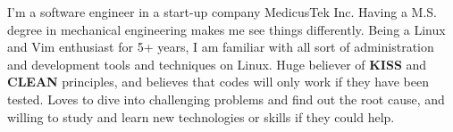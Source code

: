 

\begin{cvparagraph}

I'm a software engineer in a start-up company MedicusTek Inc. Having a M.S. degree in mechanical engineering makes me see things differently. Being a Linux and Vim enthusiast for 5+ years, I am familiar with all sort of administration and development tools and techniques on Linux. Huge believer of \textbf{KISS} and \textbf{CLEAN} principles, and believes that codes will only work if they have been tested. Loves to dive into challenging problems and find out the root cause, and willing to study and learn new technologies or skills if they could help.
\end{cvparagraph}
